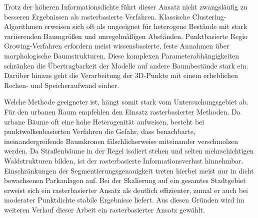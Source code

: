 Trotz der höheren Informationsdichte führt dieser Ansatz nicht zwangsläufig zu besseren Ergebnissen als rasterbasierte Verfahren. Klassische Clustering-Algorithmen erweisen sich oft als ungeeignet für heterogene Bestände mit stark variierenden Baumgrößen und unregelmäßigen Abständen. Punktbasierte Regio Growing-Verfahren erfordern meist wissensbasierte, feste Annahmen über morphologische Baumstrukturen. \citep{fuIndividualTreeSegmentationUAV2024} Diese komplexen Parameterabhängigkeiten schränken die Übertragbarkeit der Modelle auf andere Baumbestände stark ein. Darüber hinaus geht die Verarbeitung der 3D-Punkte mit einem erheblichen Rechen- und Speicheraufwand einher.\citep{liIndividualTreeSegmentation2023}

Welche Methode geeigneter ist, hängt somit stark vom Untersuchungsgebiet ab. Für den urbanen Raum empfehlen \cite{munzingerMappingUrbanForest2022} den Einsatz rasterbasierter Methoden. Da urbane Bäume oft eine hohe Heterogenität aufweisen, besteht bei punktwolkenbasierten Verfahren die Gefahr, dass benachbarte, ineinandergreifende Baumkronen fälschlicherweise miteinander verschmolzen werden. Da Straßenbäume in der Regel isoliert stehen und selten mehrschichtigen Waldstrukturen bilden, ist der rasterbasierte Informationsverlust hinnehmbar. Einschränkungen der Segmentierungsgenauigkeit treten hierbei meist nur in dicht bewachsenen Parkanlagen auf. Bei der Skalierung auf ein gesamtes Stadtgebiet erweist sich ein rasterbasierter Ansatz als deutlich effizienter, zumal er auch bei moderater Punktdichte stabile Ergebnisse liefert. Aus diesen Gründen wird im weiteren Verlauf dieser Arbeit ein rasterbasierter Ansatz gewählt.
 
